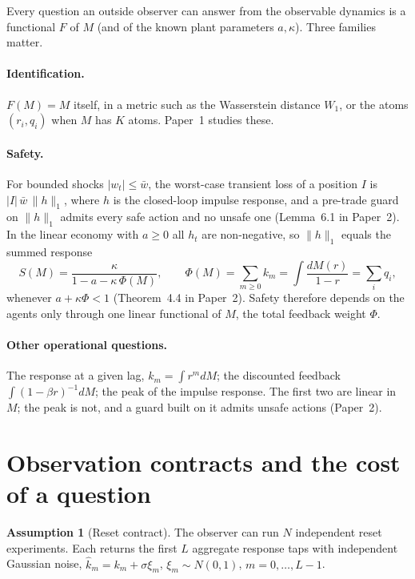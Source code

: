\documentclass[11pt]{article}
\theoremstyle{definition}
\newtheorem{assumption}[theorem]{Assumption}
\theoremstyle{remark}
\begin{document}
Every question an outside observer can answer from the observable dynamics is a functional $F$ of $M$ (and of the known plant parameters $a,\kappa$). Three families matter.

\paragraph{Identification.} $F(M)=M$ itself, in a metric such as the Wasserstein distance $W_1$, or the atoms $(r_i,q_i)$ when $M$ has $K$ atoms. Paper~1 studies these.

\paragraph{Safety.} For bounded shocks $|w_t|\le\bar w$, the worst-case transient loss of a position $I$ is $|I|\,\bar w\,\|h\|_1$, where $h$ is the closed-loop impulse response, and a pre-trade guard on $\|h\|_1$ admits every safe action and no unsafe one (Lemma~\textup{6.1 in Paper~2}). In the linear economy with $a\ge0$ all $h_t$ are non-negative, so $\|h\|_1$ equals the summed response
\begin{equation}\label{eq:fw_S}
S(M)=\frac{\kappa}{1-a-\kappa\,\Phi(M)},\qquad \Phi(M)=\sum_{m\ge0}k_m=\int\frac{dM(r)}{1-r}=\sum_i q_i ,
\end{equation}
whenever $a+\kappa\Phi<1$ (Theorem~\textup{4.4 in Paper~2}). Safety therefore depends on the agents only through one linear functional of $M$, the total feedback weight $\Phi$.

\paragraph{Other operational questions.} The response at a given lag, $k_m=\int r^m dM$; the discounted feedback $\int (1-\beta r)^{-1}dM$; the peak of the impulse response. The first two are linear in $M$; the peak is not, and a guard built on it admits unsafe actions (Paper~2).

\section{Observation contracts and the cost of a question}\label{sec:fw_contracts}

\begin{assumption}[Reset contract]\label{ass:reset}
The observer can run $N$ independent reset experiments. Each returns the first $L$ aggregate response taps with independent Gaussian noise, $\hat k_m=k_m+\sigma\xi_m$, $\xi_m\sim N(0,1)$, $m=0,\dots,L-1$.
\end{assumption}
\end{document}
